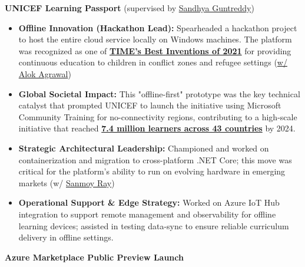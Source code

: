 \documentclass[a4paper,11pt]{article}
\begin{document}
\item \textbf{UNICEF Learning Passport} (supervised by \href{https://www.linkedin.com/in/sandhya-guntreddy-0301521/}{Sandhya Guntreddy})
\begin{itemize}[label=\tiny$\circ$, leftmargin=1em, itemsep=1.0mm]
    \item \textbf{Offline Innovation (Hackathon Lead):} Spearheaded a hackathon project to host the entire cloud service locally on Windows machines. The platform was recognized as one of \href{https://time.com/collection/best-inventions-2021/6112659/unicef-the-learning-passport/}{\textbf{TIME’s Best Inventions of 2021}} for providing continuous education to children in conflict zones and refugee settings (\href{https://www.linkedin.com/in/alok-agrawal-iima/}{w/ Alok Agrawal})
    \item \textbf{Global Societal Impact:} This "offline-first" prototype was the key technical catalyst that prompted UNICEF to launch the initiative using Microsoft Community Training for no-connectivity regions, contributing to a high-scale initiative that reached \href{https://www.learningpassport.org/reports/january-june-2024-progress-report}{\textbf{7.4 million learners across 43 countries}} by 2024.
    \item \textbf{Strategic Architectural Leadership:} Championed and worked on containerization and migration to cross-platform .NET Core; this move was critical for the platform's ability to run on evolving hardware in emerging markets (w/ \href{https://www.linkedin.com/in/sanmoy/}{Sanmoy Ray})
    \item \textbf{Operational Support \& Edge Strategy:} Worked on Azure IoT Hub integration to support remote management and observability for offline learning devices; assisted in testing data-sync to ensure reliable curriculum delivery in offline settings.
\end{itemize}
\vspace{2mm}
\item \textbf{Azure Marketplace Public Preview Launch}
\end{document}
